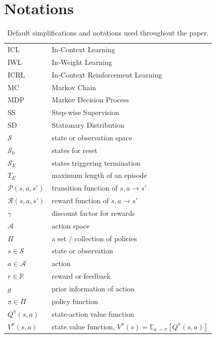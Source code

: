 \documentclass{article}
\begin{document}

\appendix

\section{Notations}

\begin{table}[t]
\caption{Default simplifications and notations used throughout the paper.}
\label{table:notation}
\vskip 0.15in
\begin{center}
\begin{small}
\begin{sc}
\begin{tabular}{ll}
\toprule
ICL & In-Context Learning \\
IWL & In-Weight Learning \\
ICRL & In-Context Reinforcement Learning \\
MC & Markov Chain \\
MDP & Markov Decision Process \\
SS & Step-wise Supervision \\
SD & Stationary Distribution \\
\midrule
$\mathcal{S}$  & state or observation space \\
$\mathcal{S}_0$  & states for reset \\
$\mathcal{S}_E$ & states triggering termination \\
$T_E$ & maximum length of an episode \\
$\mathcal{P}(s,a,s')$ & transition function of $s, a \rightarrow s'$ \\
$\mathcal{R}(s,a,s')$ & reward function of $s, a \rightarrow s'$ \\
$\gamma$ & discount factor for rewards \\
$\mathcal{A}$  & action space \\
$\Pi$  & a set / collection of policies \\
$s \in \mathcal{S}$ & state or observation \\
$a \in \mathcal{A}$ & action \\
$r \in \mathbb{R}$ & reward or feedback \\
$g$ & prior information of action \\
$\pi \in \Pi$ & policy function \\
$Q^{\pi}(s,a)$ & state-action value function \\
$V^{\pi}(s,a)$ & state value function, $V^{\pi}(s) = \mathbb{E}_{a~\sim \pi}[Q^{\pi}(s, a)]$ \\

\end{tabular}
\end{sc}
\end{small}
\end{center}
\end{table}
\end{document}
